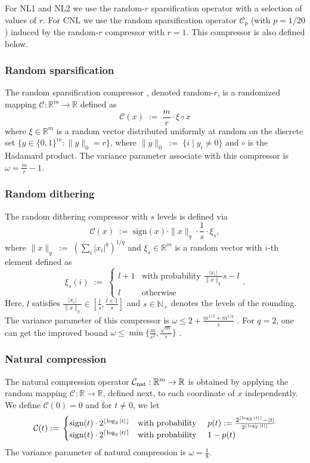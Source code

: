 \documentclass[10pt]{article}
\newcommand{\eqdef}{\; { := }\;}
\newcommand{\R}{\mathbb{R}}
\newcommand{\cC}{{\mathcal{C}}}
\begin{document}
For {\sf NL1} and {\sf NL2} we use the random-$r$ sparsification operator with a selection of values of $r$.  For {\sf CNL} we use the random sparsification operator $\cC_p$ (with $p=1/20$)  induced by the random-$r$ compressor with $r=1$. This compressor is also defined below.




\subsubsection{Random sparsification} The random sparsification compressor \citep{stich2018sparsified}, denoted random-$r$, is a randomized mapping $\cC:\R^m\to \R$ defined as $$\cC(x) \eqdef \frac{m}{r} \cdot \xi \circ x$$ where  $\xi \in \R^m$ is a random vector distributed uniformly at random on the discrete set $\{  y \in \{0, 1 \}^m : \|y\|_0 = r  \}$, where $\|y\|_0\eqdef \{i \;|\; y_i \neq 0\}$ and  $\circ$ is the Hadamard product. The variance  parameter associate with this compressor is $\omega = \frac{m}{r} - 1$. 

\subsubsection{Random dithering} The random dithering compressor \citep{Alistarh17, DIANA2} with $s$ levels is defined via 
$$\cC(x)\eqdef \text{sign}(x)\cdot \|x\|_q\cdot \frac{1}{s} \cdot \xi_s,$$ 
where $\|x\|_q\eqdef \left(\sum_i |x_i|^q\right)^{1/q}$ and $\xi_s\in\R^m$ is a random vector with 
$i$-th element  defined as
$$\xi_s(i)\eqdef \begin{cases}
	l+1 &\text {with probability } \frac{|x_i|}{\|x\|_q}s- l \\
	l &\text {otherwise}
\end{cases}.$$ Here, $l$ satisfies $\frac{|x_i|}{\|x\|_q}\in [\frac{l}{s}, \frac{l+1}{s}]$ and $s \in \mathbb{N}_+$ denotes the levels of the rounding. The variance parameter of this compressor is $\omega \leq 2 + \frac{m^{1/2} + m^{1/q}}{s}$ \citep{DIANA2}. For $q=2$, one can get the improved bound $\omega \leq \min\{  \frac{m}{s^2}, \frac{\sqrt{m}}{s}  \}$ \citep{Alistarh17}.  

\subsubsection{Natural compression} The natural compression  \citep{Cnat} operator $\cC_{\rm nat}:\R^m \to \R$ is obtained by applying the random mapping $\cC_{}:\R\to \R$, defined next, to each coordinate of $x$ independently. We define $\cC(0)=0$ and for $t\neq 0$, we let
$$
\cC(t) \eqdef \begin{cases}
	{\rm sign}(t) \cdot 2^{\lfloor \log_2|t| \rfloor } &\text {with probability } \quad p(t) \eqdef \frac{2^{\lceil \log_2|t| \rceil } - |t|}{2^{\lfloor \log_2|t| \rfloor }} \\
	{\rm sign}(t) \cdot 2^{\lceil \log_2|t| \rceil } &\text {with probability } \quad 1-p(t) 
\end{cases}
$$
The variance parameter of natural compression is $\omega = \frac{1}{8}$. 
\end{document}
